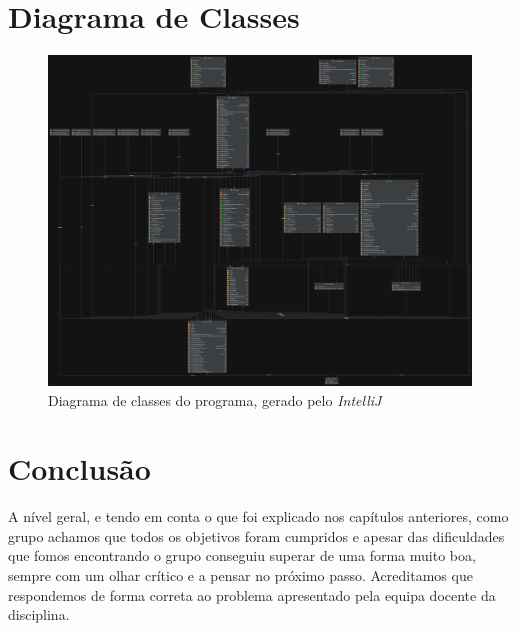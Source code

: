 \documentclass[a4paper]{report}
\begin{document}
	\chapter{Diagrama de Classes}
	\begin{figure}[H]
		\begin{center}
			\includegraphics[height=0.6\textheight]{diagramaSemTeste.jpg}
			\caption{Diagrama de classes do programa, gerado pelo \emph{IntelliJ}}
		\end{center}
	\end{figure}	

	\chapter{Conclusão}

	A nível geral, e tendo em conta o que foi explicado nos capítulos anteriores, como grupo achamos que todos os objetivos foram cumpridos e apesar das dificuldades que fomos encontrando o grupo conseguiu superar de uma forma muito boa, sempre com um olhar crítico e a pensar no próximo passo. Acreditamos que respondemos de forma correta ao problema apresentado pela equipa docente da disciplina.
	
	
\end{document}
